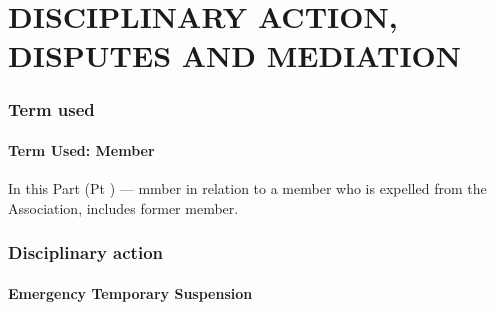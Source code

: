 \documentclass[../constitution.tex]{subfiles}
\begin{document}
\part{DISCIPLINARY ACTION, DISPUTES AND MEDIATION} \label{part-4-disciplinary-action-disputes-and-mediation}


\section{Term used} \label{division-1-term-used}

\hypertarget{term-used-member}{%
\subsection{Term Used: Member}\label{term-used-member}}

In this Part (Pt \ref{part-4-disciplinary-action-disputes-and-mediation}) --- mmber in relation to a member who is expelled from the Association, includes former member.

\hypertarget{division-2-disciplinary-action}{%
\section{Disciplinary action}\label{division-2-disciplinary-action}}

\hypertarget{emergency-temporary-suspension}{%
\subsection{Emergency Temporary Suspension}\label{emergency-temporary-suspension}}
\end{document}
